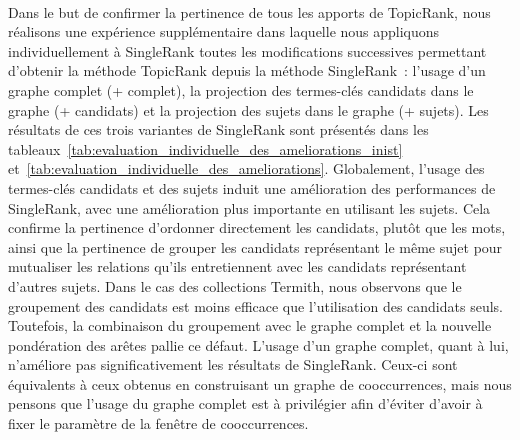         ~\\Dans le but de confirmer la pertinence de tous les apports de
        TopicRank, nous réalisons une expérience supplémentaire dans laquelle
        nous appliquons individuellement à SingleRank toutes les modifications
        successives permettant d'obtenir la méthode TopicRank depuis la méthode
        SingleRank~: l'usage d'un graphe complet (+ complet), la projection des
        termes-clés candidats dans le graphe (+ candidats) et la projection des
        sujets dans le graphe (+ sujets). Les résultats de ces trois variantes
        de SingleRank sont présentés dans les
        tableaux~\ref{tab:evaluation_individuelle_des_ameliorations_inist}
        et~\ref{tab:evaluation_individuelle_des_ameliorations}. Globalement,
        l'usage des termes-clés candidats et des sujets induit une amélioration
        des performances de SingleRank, avec une amélioration plus importante en
        utilisant les sujets. Cela confirme la pertinence d'ordonner directement
        les candidats, plutôt que les mots, ainsi que la pertinence de grouper
        les candidats représentant le même sujet pour mutualiser les relations
        qu'ils entretiennent avec les candidats représentant d'autres sujets.
        Dans le cas des collections Termith, nous observons que le groupement
        des candidats est moins efficace que l'utilisation des candidats seuls.
        Toutefois, la combinaison du groupement avec le graphe complet et la
        nouvelle pondération des arêtes pallie ce défaut. L'usage d'un graphe
        complet, quant à lui, n'améliore pas significativement les résultats de
        SingleRank. Ceux-ci sont équivalents à ceux obtenus en construisant un
        graphe de cooccurrences, mais nous pensons que l'usage du graphe complet
        est à privilégier afin d'éviter d'avoir à fixer le paramètre de la
        fenêtre de cooccurrences.
